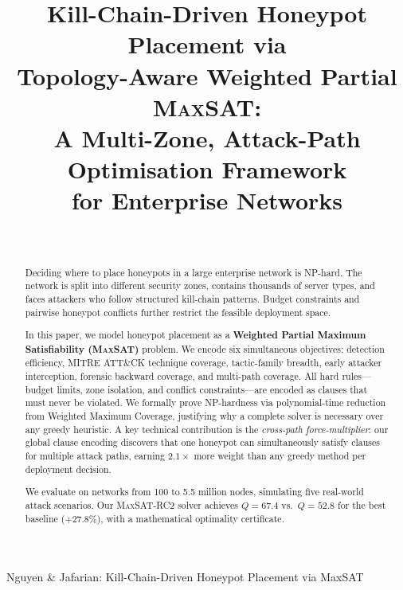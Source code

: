 \documentclass[journal]{IEEEtran}
\newcommand{\maxsat}{\textsc{MaxSAT}}
\begin{document}
\title{Kill-Chain-Driven Honeypot Placement via\\
       Topology-Aware Weighted Partial \textsc{MaxSAT}:\\
       A Multi-Zone, Attack-Path Optimisation Framework\\
       for Enterprise Networks}

\author{%
  \\
}

%
{Nguyen \& Jafarian: Kill-Chain-Driven Honeypot Placement via MaxSAT}

\maketitle

\begin{abstract}
Deciding where to place honeypots in a large enterprise
network is NP-hard.
The network is split into different security zones, contains
thousands of server types, and faces attackers who follow
structured kill-chain patterns.
Budget constraints and pairwise honeypot conflicts
further restrict the feasible deployment space.

In this paper, we model honeypot placement as a
\textbf{Weighted Partial Maximum Satisfiability (\maxsat{})}
problem.
We encode six simultaneous objectives: detection efficiency,
MITRE ATT\&CK technique coverage, tactic-family breadth,
early attacker interception, forensic backward coverage, and
multi-path coverage.
All hard rules---budget limits, zone isolation, and conflict
constraints---are encoded as clauses that must never be
violated.
We formally prove NP-hardness via polynomial-time reduction
from Weighted Maximum Coverage, justifying why a complete
solver is necessary over any greedy heuristic.
A key technical contribution is the \emph{cross-path
force-multiplier}: our global clause encoding discovers that
one honeypot can simultaneously satisfy clauses for multiple
attack paths, earning $2.1\times$ more weight than any
greedy method per deployment decision.

We evaluate on networks from 100 to 5.5 million nodes,
simulating five real-world attack scenarios.
Our \maxsat{}-RC2 solver achieves $Q=67.4$ vs.\ $Q=52.8$
for the best baseline ($+27.8\%$), with a mathematical
optimality certificate.
\end{abstract}
\end{document}
